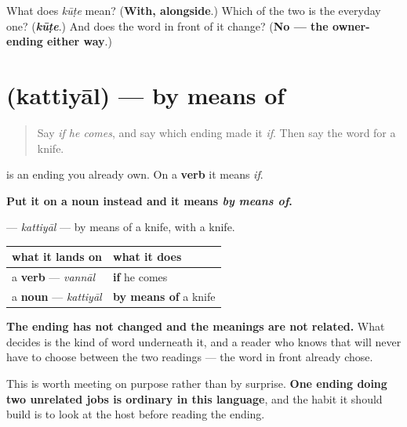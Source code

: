 \begin{tcolorbox}[breakable,colback=teal!4,colframe=teal!35!black,title={Before you move on}]
What does \emph{kūṭe} mean? (\textbf{With, alongside}.) Which of the two is the everyday one? (\emph{\textbf{kūṭe}}.) And does the word in front of it change? (\textbf{No — the owner-ending either way}.)
\end{tcolorbox}
\section[\texorpdfstring{\ml{കത്തിയാൽ} (kattiyāl)}{കത്തിയാൽ (kattiyāl)}]{ (kattiyāl) — by means of}

\label{lesson:ML-C86-aal-instrumental}



\begin{quote}
Say \emph{if he comes}, and say which ending made it \emph{if}. Then say the word for a knife.
\end{quote}

\begin{grammarlens}[title={Grammar Lens: the same ending on a different kind of word}]
\textbf{} is an ending you already own. On a \textbf{verb} it means \emph{if}.

\textbf{Put it on a noun instead and it means \emph{by means of}.}

\textbf{} — \emph{kattiyāl} — by means of a knife, with a knife.

\noindent
\begin{tabularx}{\linewidth}{@{}>{\raggedright\arraybackslash}X>{\raggedright\arraybackslash}X@{}}
\toprule
\textbf{what it lands on} & \textbf{what it does} \\
\midrule
a \textbf{verb} — \emph{vannāl} & \textbf{if} he comes \\
a \textbf{noun} — \emph{kattiyāl} & \textbf{by means of} a knife \\
\bottomrule
\end{tabularx}

\textbf{The ending has not changed and the meanings are not related.} What decides is the kind of word underneath it, and a reader who knows that will never have to choose between the two readings — the word in front already chose.

This is worth meeting on purpose rather than by surprise. \textbf{One ending doing two unrelated jobs is ordinary in this language}, and the habit it should build is to look at the host before reading the ending.
\end{grammarlens}

